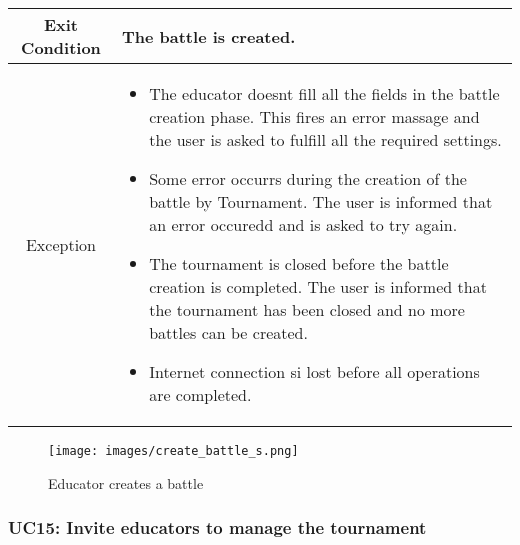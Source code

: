 \documentclass[a4paper, 11pt, titlepage]{article}
\begin{document}
\begin{center}
\begin{tabularx}{\linewidth} {|c|X|}
        \hline 
        Exit Condition &
        The battle is created.\\
        \hline 
        Exception &
        \begin{itemize}
            \item The educator doesnt fill all the fields in the battle creation phase. This fires an error massage and the user is asked to fulfill all the required settings.
            \item Some error occurrs during the creation of the battle by Tournament. The user is informed that an error occuredd and is asked to try again.
            \item The tournament is closed before the battle creation is completed. The user is informed that the tournament has been closed and no more battles can be created.
            \item Internet connection si lost before all operations are completed.  
        \end{itemize} \\
        \hline
    \end{tabularx}
\end{center}

\begin{figure}[h!]
    \centering
    \texttt{[image: images/create\_battle\_s.png]}
    \caption{Educator creates a battle}
    \label{fig:seq_diag_create_battle}
    
\end{figure}

\clearpage

\subsubsection*{UC15: Invite educators to manage the tournament}
\end{document}

